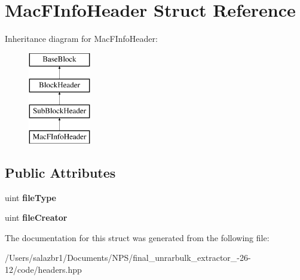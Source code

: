 \hypertarget{struct_mac_f_info_header}{\section{Mac\-F\-Info\-Header Struct Reference}
\label{struct_mac_f_info_header}
}
Inheritance diagram for Mac\-F\-Info\-Header\-:\begin{figure}[H]
\begin{center}
\leavevmode
\includegraphics[height=4.000000cm]{struct_mac_f_info_header}
\end{center}
\end{figure}
\subsection*{Public Attributes}
\begin{DoxyCompactItemize}
\item 
\hypertarget{struct_mac_f_info_header_a92850562e6d62075301dfbb8342e8080}{uint {\bfseries file\-Type}}\label{struct_mac_f_info_header_a92850562e6d62075301dfbb8342e8080}

\item 
\hypertarget{struct_mac_f_info_header_abbfce87f4474e5700a5c02717e9201da}{uint {\bfseries file\-Creator}}\label{struct_mac_f_info_header_abbfce87f4474e5700a5c02717e9201da}

\end{DoxyCompactItemize}


The documentation for this struct was generated from the following file\-:\begin{DoxyCompactItemize}
\item 
/\-Users/salazbr1/\-Documents/\-N\-P\-S/final\-\_\-unrarbulk\-\_\-extractor\-\_-\/26-\/12/code/headers.\-hpp\end{DoxyCompactItemize}
